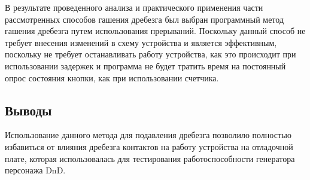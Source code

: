\documentclass{altsu-report}
\begin{document}
В результате проведенного анализа и практического применения части рассмотренных способов гашения дребезга был выбран программный метод гашения дребезга путем использования прерываний. Поскольку данный способ не требует внесения изменений в схему устройства и является эффективным, поскольку не требует останавливать работу устройства, как это происходит при использовании задержек и программа не будет тратить время на постоянный опрос состояния кнопки, как при использовании счетчика.

\subsection*{Выводы}

Использование данного метода для подавления дребезга позволило полностью избавиться от влияния дребезга контактов на работу устройства на отладочной плате, которая использовалась для тестирования работоспособности генератора персонажа DnD.
\end{document}
